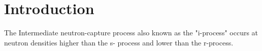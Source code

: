 \section*{Introduction}

The Intermediate neutron-capture process also known as the "i-process" occurs at neutron densities higher than the s- process and lower than the r-process. 

